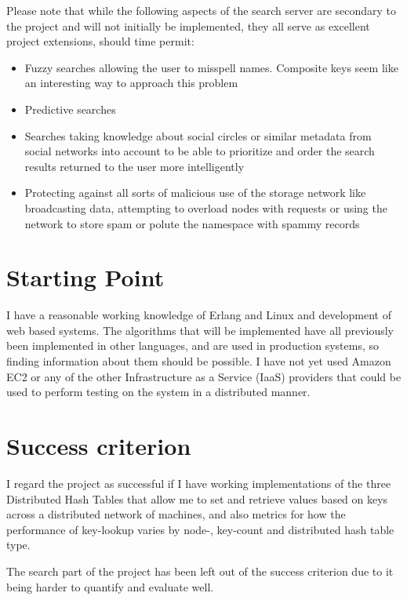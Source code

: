 Please note that while the following aspects of the search server are secondary to the project and will not initially be implemented, they all serve as excellent project extensions, should time permit:

\begin{itemize}
  \item Fuzzy searches allowing the user to misspell names. Composite keys seem like an interesting way to approach this problem
  \item Predictive searches
  \item Searches taking knowledge about social circles or similar metadata from social networks into account to be able to prioritize and order the search results returned to the user more intelligently
  \item Protecting against all sorts of malicious use of the storage network like broadcasting data, attempting to overload nodes with requests or using the network to store spam or polute the namespace with spammy records
\end{itemize}


\section*{Starting Point}

I have a reasonable working knowledge of Erlang and Linux and development of web based systems. The algorithms that will be implemented have all previously been implemented in other languages, and are used in production systems, so finding information about them should be possible. I have not yet used Amazon EC2 or any of the other Infrastructure as a Service (IaaS) providers that could be used to perform testing on the system in a distributed manner.


\section*{Success criterion}

I regard the project as successful if I have working implementations of the three Distributed Hash Tables that allow me to set and retrieve values based on keys across a distributed network of machines, and also metrics for how the performance of key-lookup varies by node-, key-count and distributed hash table type.

The search part of the project has been left out of the success criterion due to it being harder to quantify and evaluate well.

